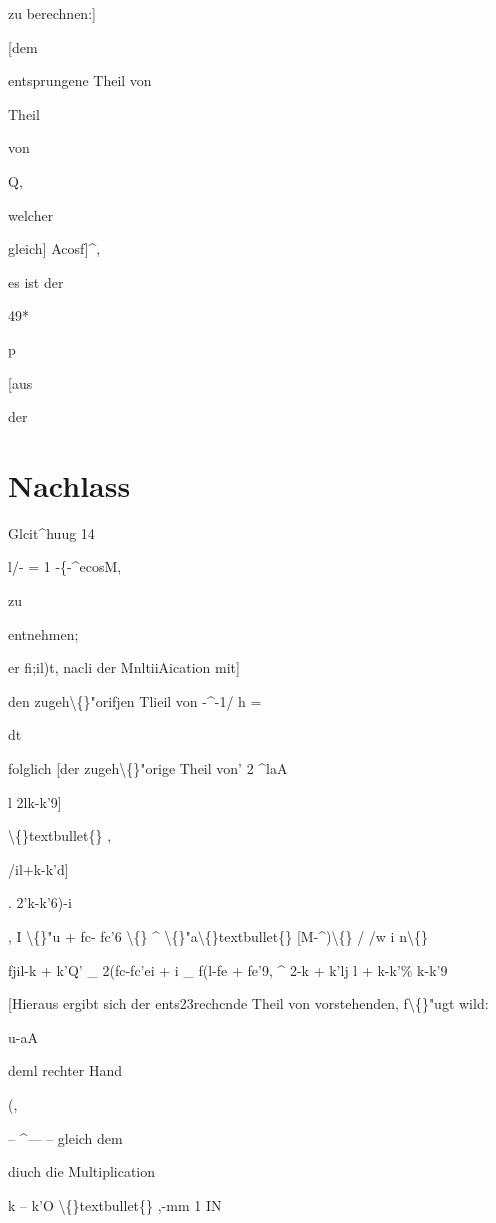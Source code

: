 \documentclass[10pt,a4paper]{article}
\begin{document}
zu berechnen:]

[dem

entsprungene Theil von

Theil

von

Q,

welcher

gleich] Acosf]\textasciicircum{},

es ist der

49*

p

\newpage

[aus

der

\section*{Nachlass}

Glcit\textasciicircum{}huug 14

l/- = 1 -\{-\textasciicircum{}ecosM,

zu

entnehmen;

er fi;il)t, nacli der MnltiiAication mit]

den zugeh\textbackslash\{\}"orifjen Tlieil von -\textasciicircum{}-1/ h =

dt

folglich [der zugeh\textbackslash\{\}"orige Theil von' 2
\textasciicircum{}laA

l 2lk-k'9]

\textbackslash\{\}textbullet\{\} ,

/il+k-k'd]

. 2'k-k'6)-i

, I \textbackslash\{\}"u + fc- fc'6 \textbackslash\{\} \textasciicircum{} \textbackslash\{\}"a\textbackslash\{\}textbullet\{\} [M-\textasciicircum{})\textbackslash\{\}
/ /w i n\textbackslash\{\}

fjil-k + k'Q' \_ 2(fc-fc'ei + i \_ f(l-fe + fe'9,
\textasciicircum{} 2-k + k'lj l + k-k'\%
k-k'9

[Hieraus ergibt sich der ents23rechcnde Theil von
vorstehenden,
f\textbackslash\{\}"ugt wild:

u-aA

deml rechter Hand

(,

-- \textasciicircum{}--- -- gleich dem

diuch die Multiplication

k -- k'O \textbackslash\{\}textbullet\{\} ,-mm 1 IN
\end{document}
